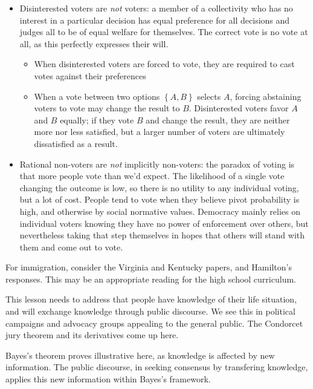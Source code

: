 \begin{itemize}
\begin{itemize}
        \item Disinterested voters are \textit{not} voters:  a member of a collectivity who has no interest in a particular decision has equal preference for all decisions and judges all to be of equal welfare for themselves.  The correct vote is no vote at all, as this perfectly expresses their will.
        \begin{itemize}
            \item When disinterested voters are forced to vote, they are required to cast votes against their preferences

            \item When a vote between two options $\left\{A,B\right\}$ selects $A$, forcing abstaining voters to vote may change the result to $B$.  Disinterested voters favor $A$ and $B$ equally; if they vote $B$ and change the result, they are neither more nor less satisfied, but a larger number of voters are ultimately dissatisfied as a result.
        \end{itemize}

        \item Rational non-voters are \textit{not} implicitly non-voters:  the paradox of voting is that more people vote than we'd expect.  The likelihood of a single vote changing the outcome is low, so there is no utility to any individual voting, but a lot of cost.  People tend to vote when they believe pivot probability is high, and otherwise by social normative values.  Democracy mainly relies on individual voters knowing they have no power of enforcement over others, but nevertheless taking that step themselves in hopes that others will stand with them and come out to vote.
    \end{itemize}
\end{itemize}

\begin{todo}
    For immigration, consider the Virginia and Kentucky papers, and Hamilton's responses.  This may be an appropriate reading for the high school curriculum.
\end{todo}

\begin{todo}
    This lesson needs to address that people have knowledge of their life situation, and will exchange knowledge through public discourse.  We see this in political campaigns and advocacy groups appealing to the general public.  The Condorcet jury theorem and its derivatives come up here.

    Bayes's theorem proves illustrative here, as knowledge is affected by new information.  The public discourse, in seeking consensus by transfering knowledge, applies this new information within Bayes's framework.
\end{todo}

